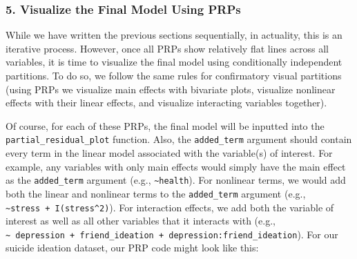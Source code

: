 \documentclass[
  man,floatsintext]{apa6}
\begin{document}
\subsubsection{5. Visualize the Final Model Using PRPs}\label{visualize-the-final-model-using-prps}

While we have written the previous sections sequentially, in actuality, this is an iterative process. However, once all PRPs show relatively flat lines across all variables, it is time to visualize the final model using conditionally independent partitions. To do so, we follow the same rules for confirmatory visual partitions (using PRPs we visualize main effects with bivariate plots, visualize nonlinear effects with their linear effects, and visualize interacting variables together).

Of course, for each of these PRPs, the final model will be inputted into the \texttt{partial\_residual\_plot} function. Also, the \texttt{added\_term} argument should contain every term in the linear model associated with the variable(s) of interest. For example, any variables with only main effects would simply have the main effect as the \texttt{added\_term} argument (e.g., \texttt{\textasciitilde{}health}). For nonlinear terms, we would add both the linear and nonlinear terms to the \texttt{added\_term} argument (e.g., \texttt{\textasciitilde{}stress\ +\ I(stress\^{}2)}). For interaction effects, we add both the variable of interest as well as all other variables that it interacts with (e.g., \texttt{\textasciitilde{}\ depression\ +\ friend\_ideation\ +\ depression:friend\_ideation}). For our suicide ideation dataset, our PRP code might look like this:
\end{document}
